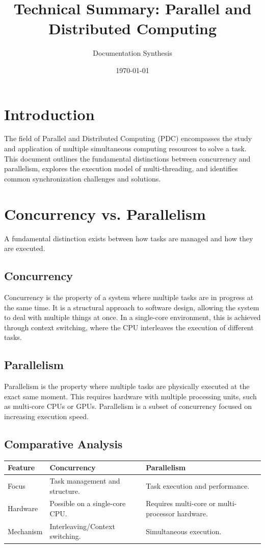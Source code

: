 \documentclass{article}
\title{Technical Summary: Parallel and Distributed Computing}
\author{Documentation Synthesis}
\date{\today}
\begin{document}
\maketitle

\section{Introduction}
The field of Parallel and Distributed Computing (PDC) encompasses the study and application of multiple simultaneous computing resources to solve a task. This document outlines the fundamental distinctions between concurrency and parallelism, explores the execution model of multi-threading, and identifies common synchronization challenges and solutions.

\section{Concurrency vs. Parallelism}
A fundamental distinction exists between how tasks are managed and how they are executed.

\subsection{Concurrency}
Concurrency is the property of a system where multiple tasks are in progress at the same time. It is a structural approach to software design, allowing the system to deal with multiple things at once. In a single-core environment, this is achieved through context switching, where the CPU interleaves the execution of different tasks.

\subsection{Parallelism}
Parallelism is the property where multiple tasks are physically executed at the exact same moment. This requires hardware with multiple processing units, such as multi-core CPUs or GPUs. Parallelism is a subset of concurrency focused on increasing execution speed.

\subsection{Comparative Analysis}
\begin{center}
  \begin{tabular}{|l|p{5cm}|p{5cm}|}
    \hline
    \textbf{Feature} & \textbf{Concurrency} & \textbf{Parallelism} \\
    \hline
    Focus & Task management and structure. & Task execution and performance. \\
    \hline
    Hardware & Possible on a single-core CPU. & Requires multi-core or multi-processor hardware. \\
    \hline
    Mechanism & Interleaving/Context switching. & Simultaneous execution. \\
    \hline
  \end{tabular}
\end{center}
\end{document}
